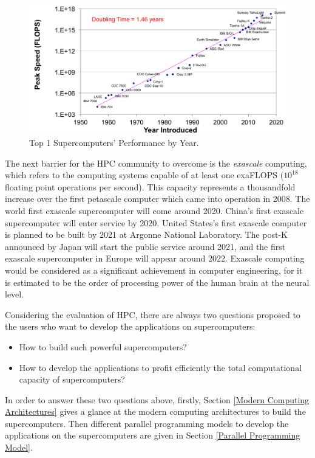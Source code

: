 \begin{figure}[htbp]
	\centering
	\includegraphics[width=6.3in]{fig/sc_evaluate.pdf}
	\caption{Top 1 Supercomputers' Performance by Year.}
		\label{sc_evaluate}
\end{figure}

The next barrier for the HPC community to overcome is the \textit{exascale} computing, which refers to the computing systems capable of at least one exaFLOPS ($10^{18}$ floating point operations per second). This capacity represents a thousandfold increase over the first petascale computer which came into operation in 2008. The world first exascale supercomputer will come around 2020. China's first exascale supercomputer will enter service by 2020. United States's first exascale computer is planned to be built by 2021 at Argonne National Laboratory. The post-K announced by Japan will start the public service around 2021, and the first exascale supercomputer in Europe will appear around 2022. Exascale computing would be considered as a significant achievement in computer engineering, for it is estimated to be the order of processing power of the human brain at the neural level.

Considering the evaluation of HPC, there are always two questions proposed to the users who want to develop the applications on supercomputers:

\begin{itemize}
	\item How to build such powerful supercomputers?
	\item How to develop the applications to profit efficiently the total computational capacity of supercomputers?
\end{itemize}

In order to answer these two questions above, firstly, Section \ref{Modern Computing Architectures} gives a glance at the modern computing architectures to build the supercomputers. Then different parallel programming models to develop the applications on the supercomputers are given in Section \ref{Parallel Programming Model}.


